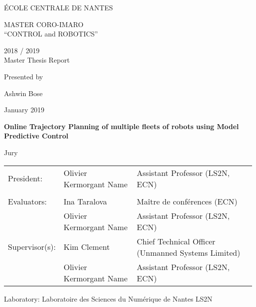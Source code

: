 \thispagestyle{empty}

\def\lskip{\vspace{0.5cm}}



\begin{center}
	ÉCOLE CENTRALE DE NANTES
\end{center}
\vspace{2cm}

\begin{center} \large\sc MASTER CORO-IMARO\\ \normalsize{``CONTROL and ROBOTICS''} \end{center}



\begin{center}
	2018 / 2019\\
	\lskip
	Master Thesis Report
	\lskip
	
	Presented by \lskip 
	
	Ashwin Bose \lskip
	
	January 2019 \lskip\lskip
	
	{\Large \textbf{Online Trajectory Planning of multiple fleets of robots using Model Predictive Control}}
	
	\vfill

Jury \lskip
		
	\end{center}
	


\begin{tabular}{p{3cm}p{7cm}p{5cm} }
 President: &Olivier Kermorgant Name & Assistant Professor (LS2N, ECN) \\ & & \\ 
 Evaluators: & Ina Taralova & Maître de conférences (ECN) \\
			&Olivier Kermorgant Name & Assistant Professor (LS2N, ECN)\\ 
  Supervisor(s):  & Kim Clement & Chief Technical Officer (Unmanned Systems Limited) \\
		  &Olivier Kermorgant Name & Assistant Professor (LS2N, ECN)\\
\end{tabular}

\lskip

\begin{flushleft}
 Laboratory: Laboratoire des Sciences du Numérique de Nantes LS2N
\end{flushleft}

\newpage
\thispagestyle{empty}
\null
\newpage
\addtocounter{page}{-1}
\pagestyle{fancy}
